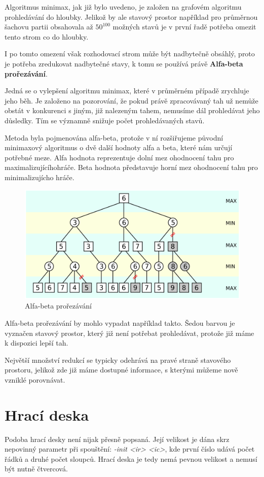 \documentclass[
12pt,
a4paper,
pdftex,
czech,
titlepage
]{report}
\begin{document}
Algoritmus minimax, jak již bylo uvedeno, je založen na grafovém algoritmu prohledávání do hloubky. Jelikož by ale stavový prostor například pro průměrnou šachovu partii obsahovala až $50^{100}$ možných stavů je v první řadě potřeba omezit tento strom co do hloubky.

I po tomto omezení však rozhodovací strom může být nadbytečně obsáhlý, proto je potřeba zredukovat nadbytečné stavy, k tomu se používá právě \textbf{Alfa-beta prořezávání}.

Jedná se o vylepšení algoritmu minimax, které v průměrném případě zrychluje jeho běh. Je založeno na pozorování, že pokud právě zpracovávaný tah už nemůže obstát v konkurenci s jiným, již nalezeným tahem, nemusíme dál prohledávat jeho důsledky. Tím se významně snižuje počet prohledávaných stavů.

Metoda byla pojmenována alfa-beta, protože v ní rozšiřujeme původní minimaxový algoritmus o dvě další hodnoty alfa a beta, které nám určují potřebné meze.
Alfa hodnota reprezentuje dolní mez ohodnocení tahu pro maximalizujícíhohráče. 
Beta hodnota představuje horní mez ohodnocení tahu pro minimalizujícho hráče. 

\begin{figure}[h]
  \centering
  \includegraphics[scale=0.3]{AB.png}
  \caption{Alfa-beta prořezávání}
\end{figure}

Alfa-beta prořezávání by mohlo vypadat například takto. Šedou barvou je vyznačen stavový prostor, který již není potřebat prohledávat, protože již máme k dispozici lepší tah. 

Největší množství redukcí se typicky odehrává na pravé straně stavového prostoru, jelikož zde již máme dostupné informace, s kterými můžeme nově vzniklé porovnávat. 

\section{Hrací deska}
Podoba hrací desky není nijak přesně popsaná. Její velikost je dána skrz nepovinný parametr při spouštění:
\textit{-init <ir> <ic>}, kde první číslo udává počet řádků a druhé počet sloupců. Hrací deska je tedy nemá pevnou velikost a nemusí být nutně čtvercová.
\end{document}
